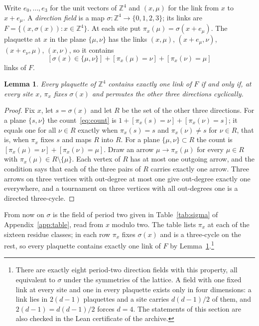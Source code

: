 \documentclass[aps,prd,twocolumn,superscriptaddress,nofootinbib,longbibliography,floatfix,amsmath,amssymb,10pt]{revtex4-2}
\newtheorem{lemma}[theorem]{Lemma}
\theoremstyle{definition}
\theoremstyle{remark}
\newcommand{\Z}{\mathbb{Z}}
\begin{document}
Write $e_0,\dots,e_3$ for the unit vectors of $\Z^4$ and $(x,\mu)$ for the
link from $x$ to $x+e_\mu$. A \emph{direction field} is a map
$\sigma:\Z^4\to\{0,1,2,3\}$; its links are $F=\{(x,\sigma(x)):x\in\Z^4\}$. At
each site put $\pi_x(\mu)=\sigma(x+e_\mu)$. The plaquette at $x$ in the plane
$\{\mu,\nu\}$ has the links $(x,\mu)$, $(x+e_\mu,\nu)$, $(x+e_\nu,\mu)$,
$(x,\nu)$, so it contains
\begin{equation}\label{eq:count}
[\sigma(x)\in\{\mu,\nu\}]+[\pi_x(\mu)=\nu]+[\pi_x(\nu)=\mu]
\end{equation}
links of $F$.

\begin{lemma}\label{lem:cycle}
Every plaquette of $\Z^4$ contains exactly one link of $F$ if and only if, at
every site $x$, $\pi_x$ fixes $\sigma(x)$ and permutes the other three
directions cyclically.
\end{lemma}

\begin{proof}
Fix $x$, let $s=\sigma(x)$ and let $R$ be the set of the other three
directions. For a plane $\{s,\nu\}$ the count~\eqref{eq:count} is $1+[\pi_x(s)
=\nu]+[\pi_x(\nu)=s]$; it equals one for all $\nu\in R$ exactly when
$\pi_x(s)=s$ and $\pi_x(\nu)\ne s$ for $\nu\in R$, that is, when $\pi_x$ fixes
$s$ and maps $R$ into $R$. For a plane $\{\mu,\nu\}\subset R$ the count is
$[\pi_x(\mu)=\nu]+[\pi_x(\nu)=\mu]$. Draw an arrow $\mu\to\pi_x(\mu)$ for every
$\mu\in R$ with $\pi_x(\mu)\in R\setminus\{\mu\}$. Each vertex of $R$ has at most
one outgoing arrow, and the condition says that each of the three pairs of
$R$ carries exactly one arrow. Three arrows on three vertices with out-degree
at most one give out-degree exactly one everywhere, and a tournament on three
vertices with all out-degrees one is a directed three-cycle.
\end{proof}

From now on $\sigma$ is the field of period two given in
Table~\ref{tab:sigma} of Appendix~\ref{app:table}, read from $x$ modulo two.
The table lists $\pi_x$ at each of the sixteen residue classes; in each row
$\pi_x$ fixes $\sigma(x)$ and is a three-cycle on the rest, so every plaquette
contains exactly one link of $F$ by Lemma~\ref{lem:cycle}.\footnote{There are
exactly eight period-two direction fields with this property, all equivalent
to $\sigma$ under the symmetries of the lattice. A field with one fixed link
at every site and one in every plaquette exists only in four dimensions: a
link lies in $2(d-1)$ plaquettes and a site carries $d(d-1)/2$ of them, and
$2(d-1)=d(d-1)/2$ forces $d=4$. The statements of this section are also
checked in the Lean certificate of the archive.}
\end{document}
